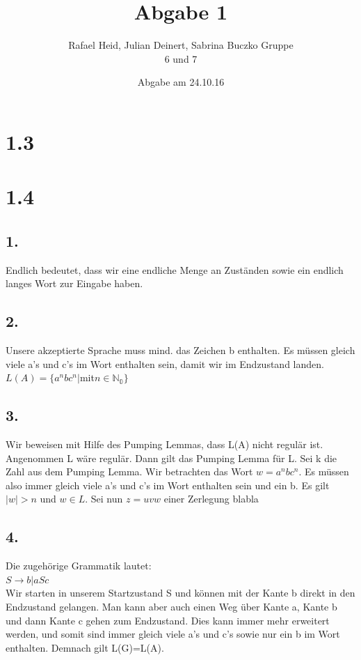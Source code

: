 \documentclass[a4paper,12pt]{scrartcl}
\title{Abgabe 1}
\author{Rafael Heid, Julian Deinert, Sabrina Buczko Gruppe\\ 6 und 7}
\date{Abgabe am 24.10.16}
\begin{document}
\maketitle
\newpage
\section*{1.3}

\section*{1.4}
\subsection*{1.}
Endlich bedeutet, dass wir eine endliche Menge an Zuständen sowie ein endlich langes Wort zur Eingabe haben.
\subsection*{2.}
Unsere akzeptierte Sprache muss mind. das Zeichen b enthalten. Es müssen gleich viele a's und c's im Wort enthalten sein, damit wir im Endzustand landen.\\
$L(A)=\{a^{n}bc^{n} | $mit$ n\in \mathds{N_{0}}\}$
\subsection*{3.}
Wir beweisen mit Hilfe des Pumping Lemmas, dass L(A) nicht regulär ist.\\
Angenommen L wäre regulär. Dann gilt das Pumping Lemma für L. Sei k die Zahl aus dem Pumping Lemma. Wir betrachten das Wort $w=a^{n}bc^{n}$. Es müssen also immer gleich viele a's und c's im Wort enthalten sein und ein b. Es gilt $|w|>n$ und $w\in L.$ Sei nun $z=uvw$ einer Zerlegung blabla
\subsection*{4.}
Die zugehörige Grammatik lautet:\\
$S\rightarrow b | aSc$\\
Wir starten in unserem Startzustand S und können mit der Kante b direkt in den Endzustand gelangen. Man kann aber auch einen Weg über Kante a, Kante b und dann Kante c gehen zum Endzustand. Dies kann immer mehr erweitert werden, und somit sind immer gleich viele a's und c's sowie nur ein b im Wort enthalten. Demnach gilt L(G)=L(A).
\end{document}
